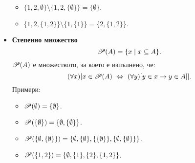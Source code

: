 \begin{itemize}
\begin{itemize}
  \item
    $\{1,2,\emptyset\} \setminus \{1,2,\{\emptyset\}\} = \{\emptyset\}$.
  \item
    $\{1,2,\{1,2\}\} \setminus \{1,\{1\}\} = \{2,\{1,2\}\}$.
  \end{itemize}
\item
  {\bf Степенно множество}
  \[\mathscr{P}(A) = \{x\mid x\subseteq A\}.\]
  $\mathscr{P}(A)$ е множеството, за което е изпълнено, че:
  \[(\forall x)[x \in \mathscr{P}(A) \ \Leftrightarrow\  (\forall y)[y\in x\rightarrow y \in A]].\]
  Примери:
  \begin{itemize}
  \item 
    $\mathscr{P}(\emptyset) = \{\emptyset\}$.
  \item
    $\mathscr{P}(\{\emptyset\}) = \{\emptyset,\{\emptyset\}\}$.
  \item
    $\mathscr{P}(\{\emptyset,\{\emptyset\}\}) = \{\emptyset,\{\emptyset\},\{\{\emptyset\}\},\{\emptyset,\{\emptyset\}\}\}$.
  \item
    $\mathscr{P}(\{1,2\}) = \{\emptyset,\{1\},\{2\},\{1,2\}\}$.
  \end{itemize}
\end{itemize}

